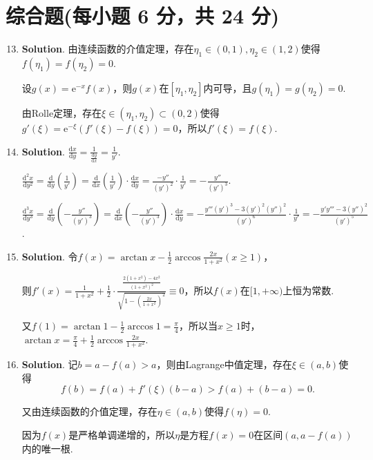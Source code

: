 \documentclass[../Main.tex]{subfiles}
\begin{document}
\section{综合题(每小题 6 分，共 24 分)}
\begin{enumerate}
    \setcounter{enumi}{12}
    \item \textbf{Solution}. 由连续函数的介值定理，存在$\eta_{1}\in(0,1),\eta
              _{2}\in(1,2)$使得$f(\eta_{1})=f(\eta_{2})=0$.

          设$g(x)=\mathrm{e}^{-x}f(x)$，则$g(x)$在$[\eta_{1},\eta_{2}]$内可导，且$g(\eta
              _{1})=g(\eta_{2})=0$.

          由Rolle定理，存在$\xi\in(\eta_{1},\eta_{2})\subset(0,2)$使得$g'(\xi)=\mathrm{e}
              ^{-\xi}(f'(\xi)-f(\xi))=0$，所以$f'(\xi)=f(\xi)$.

    \item \textbf{Solution}. $\frac{\mathrm{d}x}{\mathrm{d}y}=\frac{1}{\frac{\mathrm{d}y}{\mathrm{d}x}}
              =\frac{1}{y'}$.

          $\frac{\mathrm{d}^{2} x}{\mathrm{d}y^{2}}=\frac{\mathrm{d}}{\mathrm{d}y}\left
              (\frac{1}{y'}\right)=\frac{\mathrm{d}}{\mathrm{d}x}\left(\frac{1}{y'}\right
              )\cdot\frac{\mathrm{d}x}{\mathrm{d}y}=\frac{-y''}{(y')^{2}}\cdot\frac{1}{y'}
              =-\frac{y''}{(y')^{3}}$.

          $\frac{\mathrm{d}^{3} x}{\mathrm{d}y^{3}}=\frac{\mathrm{d}}{\mathrm{d}y}\left
              (-\frac{y''}{(y')^{3}}\right)=\frac{\mathrm{d}}{\mathrm{d}x}\left(-\frac{y''}{(y')^{3}}
              \right)\cdot\frac{\mathrm{d}x}{\mathrm{d}y}=-\frac{y'''(y')^{3}-3(y')^{2} (y'')^{2}}{(y')^{6}}
              \cdot\frac{1}{y'}=-\frac{y'y'''-3(y'')^{2}}{(y')^{5}}$.

    \item \textbf{Solution}. 令$f(x)=\arctan x-\frac{1}{2}\arccos\frac{2x}{1+x^{2}}
              (x\geq1)$，

          则$f'(x)=\frac{1}{1+x^{2}}+\frac{1}{2}\cdot\frac{\frac{2(1+x^{2})-4x^{2}}{(1+x^{2})^{2}}}{\sqrt{1-\left(\frac{2x}{1+x^2}\right)^{2}}}
              \equiv0$，所以$f(x)$在$[1,+\infty)$上恒为常数.

          又$f(1)=\arctan 1-\frac{1}{2}\arccos 1=\frac{\pi}{4}$，所以当$x\geq1$时，$\arctan
              x=\frac{\pi}{4}+\frac{1}{2}\arccos\frac{2x}{1+x^{2}}$.

    \item \textbf{Solution}. 记$b=a-f(a)>a$，则由Lagrange中值定理，存在$\xi\in
              (a,b)$使得
          \[
              f(b)=f(a)+f'(\xi)(b-a)>f(a)+(b-a)=0.
          \]

          又由连续函数的介值定理，存在$\eta\in(a,b)$使得$f(\eta)=0$.

          因为$f(x)$是严格单调递增的，所以$\eta$是方程$f(x)=0$在区间$(a,a-f(a))$内的唯一根.
\end{enumerate}
\end{document}
